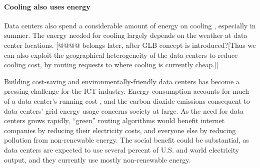 \documentclass{acm_proc_article-sp}
\begin{document}
		\paragraph{Cooling also uses energy}
			Data centers also spend a considerable amount of energy on cooling \cite{datacenter}, especially in summer. The energy needed for cooling largely depends on the weather at data center locations. [@@@@ belongs later, after GLB concept is introduced?[Thus we can also exploit the geographical heterogeneity of the data centers to reduce cooling cost, by routing requests to where cooling is currently cheap.]]
			



		Building cost-saving and environmentally-friendly data centers has become a pressing challenge for the ICT industry.
		Energy consumption accounts for much of a data center’s running cost \cite{datacenter}, and the carbon dioxide emissions consequent to data centers’ grid energy usage concerns society at large.
		As the need for data centers grows rapidly,
		“green” routing algorithms would benefit internet companies by reducing their electricity costs, and everyone else by reducing pollution from non-renewable energy. The social benefit could be substantial, as data centers are expected to use several percent of U.S. and world electricity output, and they currently use mostly non-renewable energy.
	
\end{document}
